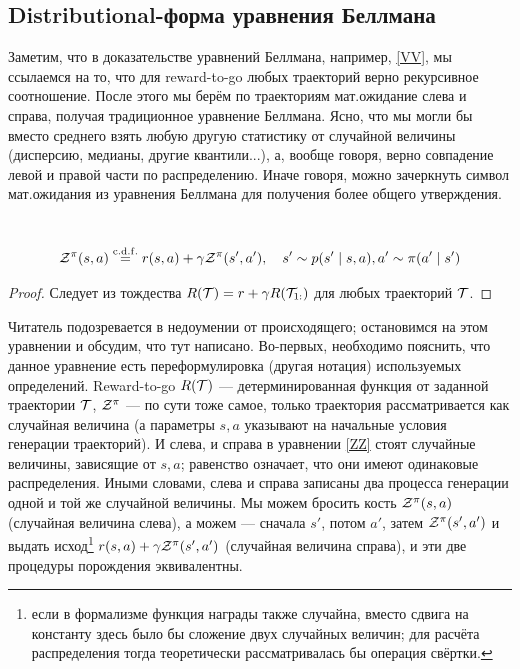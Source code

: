\subsection{Distributional-форма уравнения Беллмана}

Заметим, что в доказательстве уравнений Беллмана, например, \eqref{VV}, мы ссылаемся на то, что для reward-to-go любых траекторий верно рекурсивное соотношение. После этого мы берём по траекториям мат.ожидание слева и справа, получая традиционное уравнение Беллмана. Ясно, что мы могли бы вместо среднего взять любую другую статистику от случайной величины (дисперсию, медианы, другие квантили...), а, вообще говоря, верно совпадение левой и правой части по распределению. Иначе говоря, можно зачеркнуть символ мат.ожидания из уравнения Беллмана для получения более общего утверждения.

\begin{theorem}\,
\begin{equation}\label{ZZ}
 \mathcal{Z}^\pi(s, a) \mathrel{\stackrel{\mathrm{c.d.f.}}=} r(s, a) + \gamma \mathcal{Z}^\pi(s', a'), \quad s' \sim p(s' \mid s, a), a' \sim \pi(a' \mid s') 
\end{equation}
\begin{proof}
Следует из тождества $R(\mathcal{T}) = r + \gamma R(\mathcal{T}_{1:})$ для любых траекторий $\mathcal{T}$.
\end{proof}
\end{theorem}

Читатель подозревается в недоумении от происходящего; остановимся на этом уравнении и обсудим, что тут написано. Во-первых, необходимо пояснить, что данное уравнение есть переформулировка (другая нотация) используемых определений. Reward-to-go $R(\mathcal{T})$ --- детерминированная функция от заданной траектории $\mathcal{T}$, $\mathcal{Z}^\pi$ --- по сути тоже самое, только траектория рассматривается как случайная величина (а параметры $s, a$ указывают на начальные условия генерации траекторий). И слева, и справа в уравнении \eqref{ZZ} стоят случайные величины, зависящие от $s, a$; равенство означает, что они имеют одинаковые распределения. Иными словами, слева и справа записаны два процесса генерации одной и той же случайной величины. Мы можем бросить кость $\mathcal{Z}^\pi(s, a)$ (случайная величина слева), а можем --- сначала $s'$, потом $a'$, затем $\mathcal{Z}^\pi(s', a')$ и выдать исход\footnote{если в формализме функция награды также случайна, вместо сдвига на константу здесь было бы сложение двух случайных величин; для расчёта распределения тогда теоретически рассматривалась бы операция свёртки.} $r(s, a) \HM+ \gamma \Z^\pi(s', a')$ (случайная величина справа), и эти две процедуры порождения эквивалентны. 

